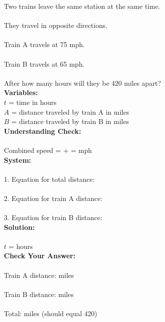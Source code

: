 \documentclass[12pt]{article}
\begin{document}
            Two trains leave the same station at the same time.\\\\
            They travel in opposite directions.\\\\
            Train A travels at 75 mph.\\\\
            Train B travels at 65 mph.\\\\
            After how many hours will they be 420 miles apart?\\
        
            \textbf{Variables:}\\
            $t$ = time in hours\\
            $A$ = distance traveled by train A in miles\\
            $B$ = distance traveled by train B in miles\\
        
            \textbf{Understanding Check:}\\\\
            Combined speed = \underline{\hspace{1in}} + \underline{\hspace{1in}} = \underline{\hspace{1in}} mph\\
        
            \textbf{System:}\\\\
            1. Equation for total distance: \underline{\hspace{4in}}\\\\	
            2. Equation for train A distance: \underline{\hspace{4in}}\\\\
            3. Equation for train B distance: \underline{\hspace{4in}}\\
        
            \textbf{Solution:}\\\\
            $t$ = \underline{\hspace{1in}} hours\\
        
            \textbf{Check Your Answer:}\\\\
            Train A distance: \underline{\hspace{2in}} miles\\\\
            Train B distance: \underline{\hspace{2in}} miles\\\\
            Total: \underline{\hspace{2in}} miles (should equal 420)
        
\end{document}
